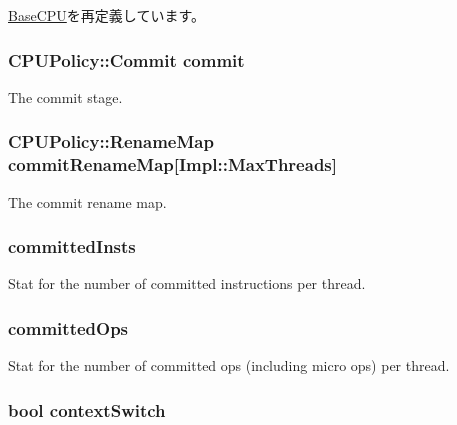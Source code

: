 \hyperlink{classBaseCPU_ad79de7771e2fdfe4aa9ba3d4f7e6972c}{BaseCPU}を再定義しています。\hypertarget{classFullO3CPU_a2cb9d36b31d8d38af97362bb47f6e930}{
\subsubsection[{commit}]{\setlength{\rightskip}{0pt plus 5cm}CPUPolicy::Commit {\bf commit}}}
\label{classFullO3CPU_a2cb9d36b31d8d38af97362bb47f6e930}
The commit stage. \hypertarget{classFullO3CPU_a276327b80d93babf5512b90c6daae5e4}{
\subsubsection[{commitRenameMap}]{\setlength{\rightskip}{0pt plus 5cm}CPUPolicy::RenameMap {\bf commitRenameMap}\mbox{[}Impl::MaxThreads\mbox{]}}}
\label{classFullO3CPU_a276327b80d93babf5512b90c6daae5e4}
The commit rename map. \hypertarget{classFullO3CPU_a45901e46dca5846ddd857aecbee16645}{
\subsubsection[{committedInsts}]{ {\bf committedInsts}}}
\label{classFullO3CPU_a45901e46dca5846ddd857aecbee16645}
Stat for the number of committed instructions per thread. \hypertarget{classFullO3CPU_a16789fd9e4f632e091d740c772094f80}{
\subsubsection[{committedOps}]{ {\bf committedOps}}}
\label{classFullO3CPU_a16789fd9e4f632e091d740c772094f80}
Stat for the number of committed ops (including micro ops) per thread. \hypertarget{classFullO3CPU_a4fd841dc8d29605dc13a120cc5a9b438}{
\subsubsection[{contextSwitch}]{\setlength{\rightskip}{0pt plus 5cm}bool {\bf contextSwitch}}}
